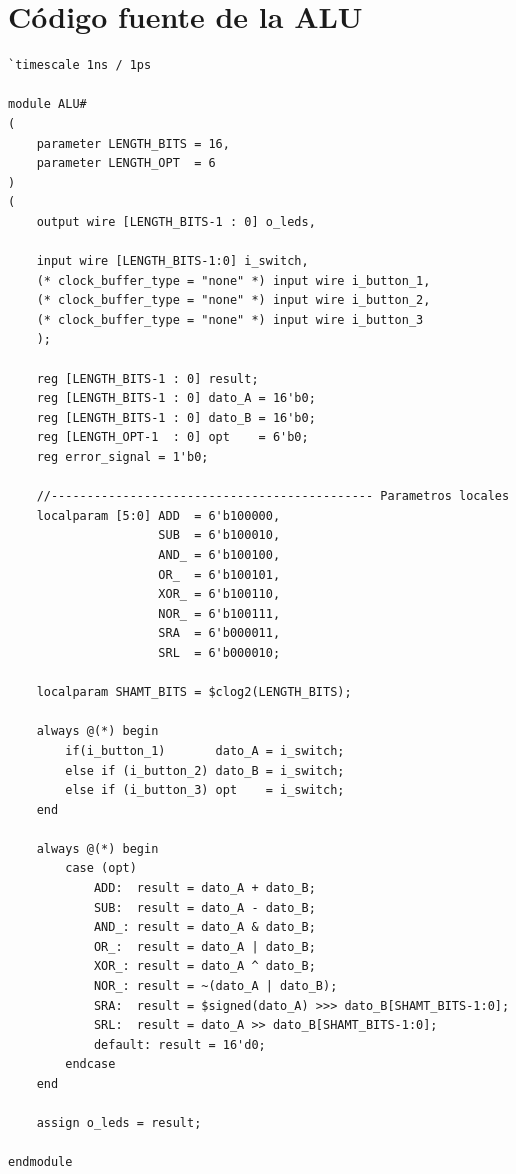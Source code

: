 \documentclass[12pt,a4paper]{article}
\begin{document}
\appendix
\section{Código fuente de la ALU}
\label{ap:alu}

\begin{lstlisting}[caption={\texttt{ALU.v} completo.}]
`timescale 1ns / 1ps

module ALU#
(
    parameter LENGTH_BITS = 16,
    parameter LENGTH_OPT  = 6
)
(
    output wire [LENGTH_BITS-1 : 0] o_leds,

    input wire [LENGTH_BITS-1:0] i_switch,
    (* clock_buffer_type = "none" *) input wire i_button_1,
    (* clock_buffer_type = "none" *) input wire i_button_2,
    (* clock_buffer_type = "none" *) input wire i_button_3
    );

    reg [LENGTH_BITS-1 : 0] result;
    reg [LENGTH_BITS-1 : 0] dato_A = 16'b0;
    reg [LENGTH_BITS-1 : 0] dato_B = 16'b0;
    reg [LENGTH_OPT-1  : 0] opt    = 6'b0;
    reg error_signal = 1'b0;

    //--------------------------------------------- Parametros locales
    localparam [5:0] ADD  = 6'b100000,
                     SUB  = 6'b100010,
                     AND_ = 6'b100100,
                     OR_  = 6'b100101,
                     XOR_ = 6'b100110,
                     NOR_ = 6'b100111,
                     SRA  = 6'b000011,
                     SRL  = 6'b000010;

    localparam SHAMT_BITS = $clog2(LENGTH_BITS);

    always @(*) begin
        if(i_button_1)       dato_A = i_switch;
        else if (i_button_2) dato_B = i_switch;
        else if (i_button_3) opt    = i_switch;
    end

    always @(*) begin
        case (opt)
            ADD:  result = dato_A + dato_B;
            SUB:  result = dato_A - dato_B;
            AND_: result = dato_A & dato_B;
            OR_:  result = dato_A | dato_B;
            XOR_: result = dato_A ^ dato_B;
            NOR_: result = ~(dato_A | dato_B);
            SRA:  result = $signed(dato_A) >>> dato_B[SHAMT_BITS-1:0];
            SRL:  result = dato_A >> dato_B[SHAMT_BITS-1:0];
            default: result = 16'd0;
        endcase
    end

    assign o_leds = result;

endmodule
\end{lstlisting}
\end{document}
